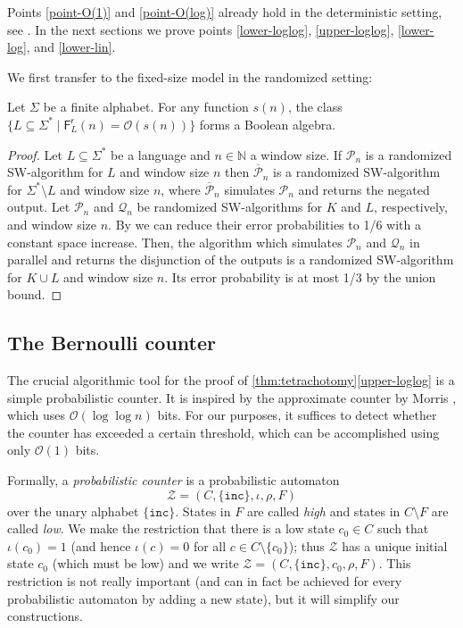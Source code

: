 \documentclass{article}\usepackage[a4paper,margin=20mm]{geometry}
\newcommand{\N}{\mathbb{N}}
\renewcommand{\O}{\mathcal{O}}
\renewcommand{\P}{\mathcal{P}}
\newcommand{\Q}{\mathcal{Q}}
\newcommand{\BZ}{\mathcal{Z}}
\newcommand{\F}{\mathsf{F}}
\renewcommand{\r}{\mathsf{r}}
\begin{document}
Points \ref{point-O(1)} and \ref{point-O(log)} already hold in the deterministic setting,
see .
In the next sections we prove points \ref{lower-loglog}, \ref{upper-loglog}, \ref{lower-log},
and \ref{lower-lin}.

We first transfer  to the fixed-size model in the randomized setting:
\begin{lemma}\label{thm:randombool}
        Let $\Sigma$ be a finite alphabet.
	For any function $s(n)$, the class $\{ L \subseteq \Sigma^* \mid \F^\r_L(n) = \O(s(n)) \}$
	forms a Boolean algebra.
\end{lemma}

\begin{proof}
       Let $L \subseteq \Sigma^*$ be a language and $n \in \N$ a window size.
	If $\P_n$ is a randomized SW-algorithm for $L$ and window size $n$ then $\overline{\P}_n$ is a randomized SW-algorithm for $\Sigma^* \setminus L$ and window size $n$,
	where $\overline{\P}_n$ simulates $\P_n$ and returns the negated output.
	Let $\P_n$ and $\Q_n$ be randomized SW-algorithms for $K$ and $L$, respectively, and window size $n$.
	By  we can reduce their error probabilities to 1/6 with a constant space increase.
	Then, the algorithm which simulates $\P_n$ and $\Q_n$ in parallel and returns the disjunction of the outputs
	is a randomized SW-algorithm for $K \cup L$ and window size $n$.
	Its error probability is at most 1/3 by the union bound.
\end{proof}

 
 

\subsection{The Bernoulli counter} \label{sec-bernoulli}

The crucial algorithmic tool for the proof of \cref{thm:tetrachotomy}\ref{upper-loglog} is 
a simple probabilistic counter. It is inspired by the approximate counter by Morris \cite{Flajolet85,Morris78a},
which uses $\O(\log \log n)$ bits.
For our purposes, it suffices to detect whether the counter has exceeded a certain threshold,
which can be accomplished using only $\O(1)$ bits.

Formally, a {\em probabilistic counter} is a probabilistic automaton 
\[  \BZ = (C,\{\mathtt{inc}\},\iota,\rho,F) \]
over the unary alphabet $\{\mathtt{inc}\}$. 
States in $F$ are called {\em high} and states in $C \setminus F$ are called {\em low}.
We make the restriction that there is a low state $c_0 \in C$ such that
$\iota(c_0) = 1$ (and hence $\iota(c)=0$ for all $c \in C \setminus \{c_0\}$); thus
$\BZ$ has a unique initial state $c_0$ (which must be low) and we write $\BZ = (C,\{\mathtt{inc}\},c_0,\rho,F)$.
This restriction is not really important (and can in fact be achieved for every 
probabilistic automaton by adding a new state), but it will simplify our constructions.
\end{document}
